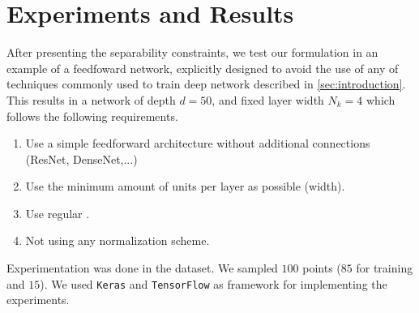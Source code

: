 
\section{Experiments and Results}\label{sec:experiments}
After presenting the separability constraints, we test our formulation in an example of a feedfoward network, explicitly designed to avoid the use of any of techniques commonly used to train deep network described in \ref{sec:introduction}. This results in a \ReLU network of depth $d=50$, and fixed layer width $N_k=4$ which follows the following requirements.
\begin{enumerate}
    \item Use a simple feedforward architecture without additional connections (ResNet, DenseNet,...)
    \item Use the minimum amount of units per layer as possible (width).
    \item Use regular \ReLU.
    \item Not using any normalization scheme.
\end{enumerate}
Experimentation was done in the \moons dataset. We sampled $100$ points ($85$ for training and $15$). We used \texttt{Keras}\cite{keras} and \texttt{TensorFlow}\cite{tensorflow} as framework for implementing the experiments.

